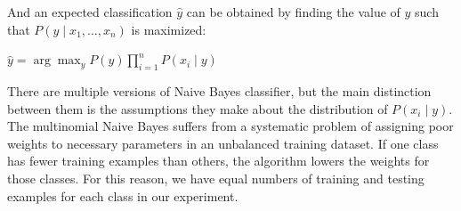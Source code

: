 And an expected classification $\hat{y}$ can be obtained by finding the value of $y$ such that $P(y \mid x_1, \dots, x_n)$ is maximized:
\begin{center}
$\hat{y} = \arg\max_y P(y) \prod_{i=1}^{n} P(x_i \mid y)$
\end{center}
There are multiple versions of Naive Bayes classifier, but the main distinction between them is the assumptions they make about the distribution of $P(x_i \mid y)$\cite{scikit-learn}. The multinomial Naive Bayes suffers from a systematic problem of assigning poor weights to necessary parameters in an unbalanced training dataset. If one class has fewer training examples than others, the algorithm lowers the weights for those classes\cite{rennie2003tackling}. For this reason, we have equal numbers of training and testing examples for each class in our experiment. 

